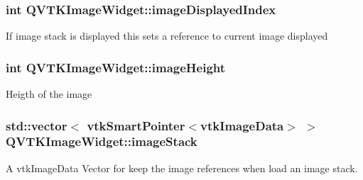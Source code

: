 \hypertarget{class_q_v_t_k_image_widget_af88ceea1f8553e4773e50b0362ffec3a}{
\subsubsection[{image\-Displayed\-Index}]{\setlength{\rightskip}{0pt plus 5cm}int {\bf Q\-V\-T\-K\-Image\-Widget\-::image\-Displayed\-Index}}}\label{d8/dd7/class_q_v_t_k_image_widget_af88ceea1f8553e4773e50b0362ffec3a}
If image stack is displayed this sets a reference to current image displayed \hypertarget{class_q_v_t_k_image_widget_acc1b249b96b147b447366361331ef60a}{
\subsubsection[{image\-Height}]{\setlength{\rightskip}{0pt plus 5cm}int {\bf Q\-V\-T\-K\-Image\-Widget\-::image\-Height}}}\label{d8/dd7/class_q_v_t_k_image_widget_acc1b249b96b147b447366361331ef60a}
Heigth of the image \hypertarget{class_q_v_t_k_image_widget_a336708e27578dab885b069f12c120138}{
\subsubsection[{image\-Stack}]{\setlength{\rightskip}{0pt plus 5cm}std\-::vector$<$ vtk\-Smart\-Pointer$<$vtk\-Image\-Data$>$ $>$ {\bf Q\-V\-T\-K\-Image\-Widget\-::image\-Stack}}}\label{d8/dd7/class_q_v_t_k_image_widget_a336708e27578dab885b069f12c120138}


A vtk\-Image\-Data Vector for keep the image references when load an image stack. 


